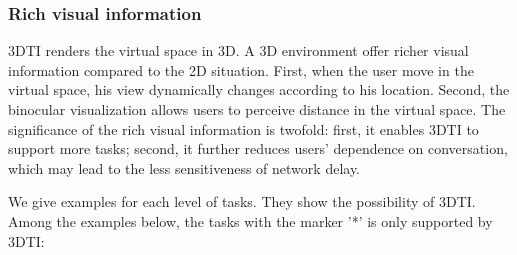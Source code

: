 \subsubsection{Rich visual information}

3DTI renders the virtual space in 3D. A 3D environment offer richer visual information compared to the 2D situation. First, when the user move in the virtual space, his view dynamically changes according to his location. Second, the binocular visualization allows users to perceive distance in the virtual space. The significance of the rich visual information is twofold: first, it enables 3DTI to support more tasks; second, it further reduces users' dependence on conversation, which may lead to the less sensitiveness of network delay.

\vspace{0.2cm}

We give examples for each level of tasks. They show the possibility of 3DTI. Among the examples below, the tasks with the marker '*' is only supported by 3DTI:

